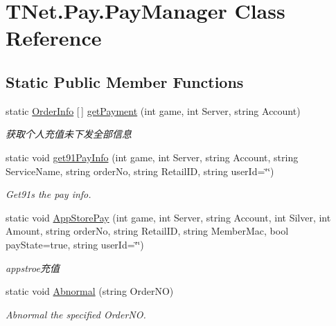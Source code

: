 \hypertarget{class_t_net_1_1_pay_1_1_pay_manager}{}\section{T\+Net.\+Pay.\+Pay\+Manager Class Reference}
\label{class_t_net_1_1_pay_1_1_pay_manager}


 


\subsection*{Static Public Member Functions}
\begin{DoxyCompactItemize}
\item 
static \mbox{\hyperlink{class_t_net_1_1_pay_1_1_order_info}{Order\+Info}} \mbox{[}$\,$\mbox{]} \mbox{\hyperlink{class_t_net_1_1_pay_1_1_pay_manager_a720c7d49d6a20743f5e986ca00020439}{get\+Payment}} (int game, int Server, string Account)
\begin{DoxyCompactList}\small\item\em 获取个人充值未下发全部信息 \end{DoxyCompactList}\item 
static void \mbox{\hyperlink{class_t_net_1_1_pay_1_1_pay_manager_a4a0eb775ccd6ed63c45de576f95bedf9}{get91\+Pay\+Info}} (int game, int Server, string Account, string Service\+Name, string order\+No, string Retail\+ID, string user\+Id=\char`\"{}\char`\"{})
\begin{DoxyCompactList}\small\item\em Get91s the pay info. \end{DoxyCompactList}\item 
static void \mbox{\hyperlink{class_t_net_1_1_pay_1_1_pay_manager_a8f091eee672ae17aee932a02ee511dcb}{App\+Store\+Pay}} (int game, int Server, string Account, int Silver, int Amount, string order\+No, string Retail\+ID, string Member\+Mac, bool pay\+State=true, string user\+Id=\char`\"{}\char`\"{})
\begin{DoxyCompactList}\small\item\em appstroe充值 \end{DoxyCompactList}\item 
static void \mbox{\hyperlink{class_t_net_1_1_pay_1_1_pay_manager_a194666a9e9d3e886a13ea097c88d9214}{Abnormal}} (string Order\+NO)
\begin{DoxyCompactList}\small\item\em Abnormal the specified Order\+NO. \end{DoxyCompactList}\item 

\end{DoxyCompactItemize}
